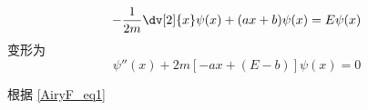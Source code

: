 

\begin{equation}
-\frac{1}{2m}\dv[2]{x}\psi(x) + (ax + b)\psi(x) = E\psi(x)
\end{equation}
变形为
\begin{equation}
\psi''(x) + 2m[-ax + (E-b)]\psi(x) = 0
\end{equation}


根据 \autoref{AiryF_eq1}~ 
